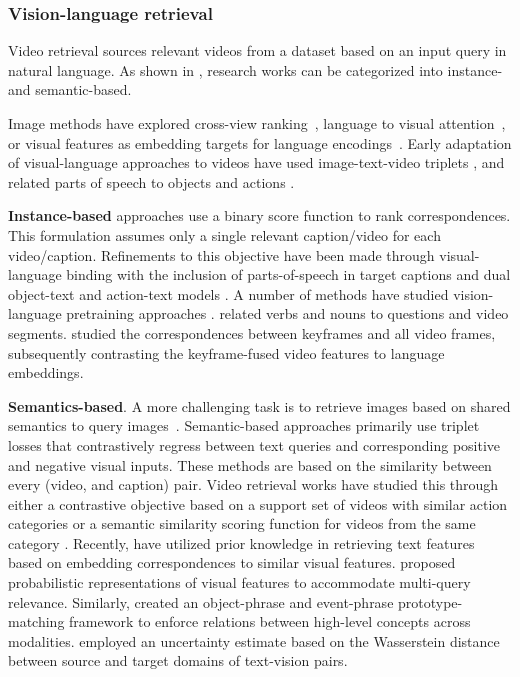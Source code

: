 \subsubsection{Vision-language retrieval} 
\label{sec:recognition::language:::vr}

Video retrieval sources relevant videos from a dataset based on an input query in natural language. As shown in , research works can be categorized into instance- and semantic-based.


Image methods have explored cross-view ranking~, language to visual attention~, or visual features as embedding targets for language encodings~. Early adaptation of visual-language approaches to videos have used image-text-video triplets , and related parts of speech to objects and actions . 

\noindent
\textbf{Instance-based} approaches use a binary score function to rank correspondences. This formulation assumes only a single relevant caption/video for each video/caption.  Refinements to this objective have been made through visual-language binding with the inclusion of parts-of-speech in target captions  and dual object-text and action-text models . A number of methods have studied vision-language pretraining approaches .  related verbs and nouns to questions and video segments.  studied the correspondences between keyframes and all video frames, subsequently contrasting the keyframe-fused video features to language embeddings.


\noindent
\textbf{Semantics-based}. A more challenging task is to retrieve images based on shared semantics to query images~. Semantic-based approaches primarily use triplet losses that contrastively regress between text queries and corresponding positive and negative visual inputs. These methods are based on the similarity between every (video, and caption)
pair. Video retrieval works have studied this through either a contrastive objective based on a support set of videos with similar action categories  or a semantic
similarity scoring function for videos from the same category . Recently,  have utilized prior knowledge in retrieving text features based on embedding correspondences to similar visual features.  proposed probabilistic representations of visual features to accommodate multi-query relevance. Similarly,  created an object-phrase and event-phrase prototype-matching framework to enforce relations between high-level concepts across modalities.  employed an uncertainty estimate based on the Wasserstein distance between source and target domains of text-vision pairs.


